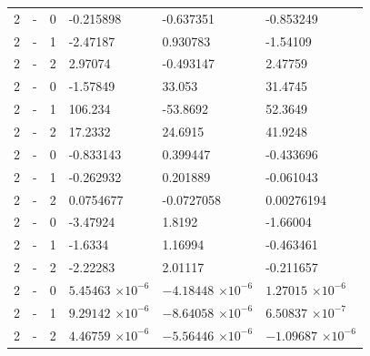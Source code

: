 \begin{longtable}
{}2 & \allowbreak{}-\allowbreak{} & 0 & -0.215898 & -0.637351 & -0.853249 \\
{}2 & \allowbreak{}-\allowbreak{} & 1 & -2.47187 & 0.930783 & -1.54109 \\
{}2 & \allowbreak{}-\allowbreak{} & 2 & 2.97074 & -0.493147 & 2.47759 \\
{}2 & \allowbreak{}-\allowbreak{} & 0 & -1.57849 & 33.053 & 31.4745 \\
{}2 & \allowbreak{}-\allowbreak{} & 1 & 106.234 & -53.8692 & 52.3649 \\
{}2 & \allowbreak{}-\allowbreak{} & 2 & 17.2332 & 24.6915 & 41.9248 \\
{}2 & \allowbreak{}-\allowbreak{} & 0 & -0.833143 & 0.399447 & -0.433696 \\
{}2 & \allowbreak{}-\allowbreak{} & 1 & -0.262932 & 0.201889 & -0.061043 \\
{}2 & \allowbreak{}-\allowbreak{} & 2 & 0.0754677 & -0.0727058 & 0.00276194 \\
{}2 & \allowbreak{}-\allowbreak{} & 0 & -3.47924 & 1.8192 & -1.66004 \\
{}2 & \allowbreak{}-\allowbreak{} & 1 & -1.6334 & 1.16994 & -0.463461 \\
{}2 & \allowbreak{}-\allowbreak{} & 2 & -2.22283 & 2.01117 & -0.211657 \\
{}2 & \allowbreak{}-\allowbreak{} & 0 &  &  &  \\
{}2 & \allowbreak{}-\allowbreak{} & 1 &  &  &  \\
{}2 & \allowbreak{}-\allowbreak{} & 2 &  &  &  \\

\end{longtable}

